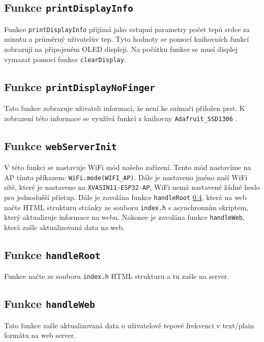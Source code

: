 \documentclass[12pt, a4paper]{article}
\begin{document}
    \subsection{Funkce \texttt{printDisplayInfo}}
    \label{subsection:printDisplayInfo}
    Funkce \texttt{printDisplayInfo} přijímá jako vstupní parametry počet tepů srdce za minutu a průměrný uživatelův tep. Tyto hodnoty se pomocí knihovních funkcí zobrazují na připojeném OLED displeji. Na počátku funkce se musí displej vymazat pomocí funkce \texttt{clearDisplay}.
    
    \subsection{Funkce \texttt{printDisplayNoFinger}}
    \label{subsection:printDisplayNoFinger}
    Tato funkce zobrazuje uživateli informaci, že není ke snímači přiložen prst. K zobrazení této informace se využívá funkcí z knihovny \texttt{Adafruit\_SSD1306} \cite{adafruitSsd1306}.
    
    \subsection{Funkce \texttt{webServerInit}}
    \label{subsection:webServerInit}
    V této funkci se nastavuje WiFi mód našeho zařízení. Tento mód nastavíme na AP tímto \newline příkazem: \texttt{WiFi.mode(WIFI\_AP)}. Dále je nastaveno jméno naší WiFi sítě, které je nastaveno na \texttt{XVASIN11-ESP32-AP}. WiFi nemá nastavené žádné heslo pro jednodušší přístup. Dále je zavolána funkce \texttt{handleRoot} \ref{subsection:handleRoot}, která na web načte HTML strukturu stránky ze souboru \texttt{index.h} s asynchronním skriptem, který aktualizuje informace na webu. Nakonec je zavolána funkce \texttt{handleWeb}, která zašle aktualizovaná data na web.
    
    \subsection{Funkce \texttt{handleRoot}}
    \label{subsection:handleRoot}
    Funkce načte ze souboru \texttt{index.h} HTML strukturu a tu zašle na server.
    \subsection{Funkce \texttt{handleWeb}}
    \label{subsection:handleWeb}
    Tato funkce zašle aktualizovaná data o uživatelově tepové frekvenci v text/plain formátu na web server.
    \newpage
\end{document}
